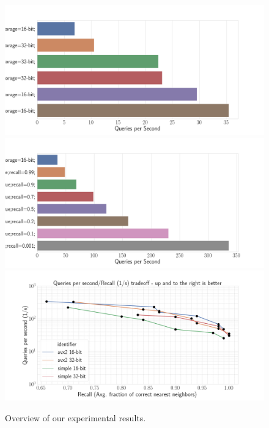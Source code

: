 \documentclass{llncs}
\begin{document}
\begin{figure}
  \includegraphics[width=\textwidth]{figs/linearscan_no_filter.png}
  \includegraphics[width=\textwidth]{figs/16bit_filter.png}
  \includegraphics[width=\textwidth]{figs/avx2_16vs32bit.png}
  \caption{Overview of our experimental results.}
  \label{plot:eval}
\end{figure}
\end{document}
